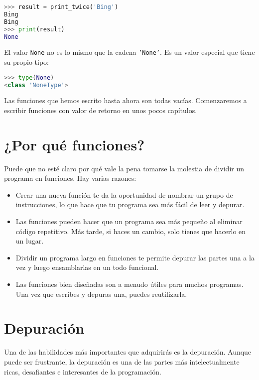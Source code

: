 \begin{lstlisting}[language=Python]
>>> result = print_twice('Bing')
Bing
Bing
>>> print(result)
None
\end{lstlisting}

El valor \texttt{None} no es lo mismo que la cadena \texttt{'None'}. Es un valor especial que tiene su propio tipo:

\begin{lstlisting}[language=Python]
>>> type(None)
<class 'NoneType'>
\end{lstlisting}

Las funciones que hemos escrito hasta ahora son todas vacías. Comenzaremos a escribir funciones con valor de retorno en unos pocos capítulos.

\section{¿Por qué funciones?}

Puede que no esté claro por qué vale la pena tomarse la molestia de dividir un programa en funciones. Hay varias razones:

\begin{itemize}
\item Crear una nueva función te da la oportunidad de nombrar un grupo de instrucciones, lo que hace que tu programa sea más fácil de leer y depurar.

\item Las funciones pueden hacer que un programa sea más pequeño al eliminar código repetitivo. Más tarde, si haces un cambio, solo tienes que hacerlo en un lugar.

\item Dividir un programa largo en funciones te permite depurar las partes una a la vez y luego ensamblarlas en un todo funcional.

\item Las funciones bien diseñadas son a menudo útiles para muchos programas. Una vez que escribes y depuras una, puedes reutilizarla.
\end{itemize}

\section{Depuración}

Una de las habilidades más importantes que adquirirás es la depuración. Aunque puede ser frustrante, la depuración es una de las partes más intelectualmente ricas, desafiantes e interesantes de la programación.

